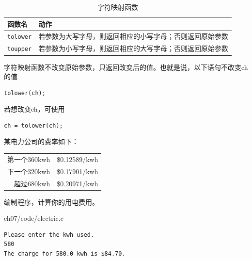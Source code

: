 \begin{frame}[fragile]
\begin{table}
\centering
\caption{字符映射函数}
\begin{tabular}{p{2cm}|p{8cm}}\hline
函数名&动作\\\hline\hline 
\lstinline|tolower| & 若参数为大写字母，则返回相应的小写字母；否则返回原始参数\\[0.1in]
\lstinline|toupper| & 若参数为小写字母，则返回相应的大写字母；否则返回原始参数 \\\hline
\end{tabular}
\end{table}
\end{frame}

\begin{frame}[fragile]
字符映射函数不改变原始参数，只返回改变后的值。也就是说，以下语句不改变ch的值
\begin{lstlisting}
tolower(ch);
\end{lstlisting}
若想改变ch，可使用
\begin{lstlisting}
ch = tolower(ch);
\end{lstlisting}
\end{frame}

\begin{frame}[fragile]
\begin{li}
某电力公司的费率如下：
\begin{table}
\centering
\begin{tabular}{r|l}\hline
第一个360kwh& \$0.12589/kwh\\[0.1in]
下一个320kwh& \$0.17901/kwh\\[0.1in]
超过680kwh & \$0.20971/kwh
\\\hline
\end{tabular}
\end{table}
编制程序，计算你的用电费用。
\end{li}
\end{frame}


\begin{frame}

{ch07/code/electric.c}
\end{frame}



\begin{frame}[fragile]
\begin{lstlisting}
Please enter the kwh used.
580
The charge for 580.0 kwh is $84.70.
\end{lstlisting}
\end{frame}


